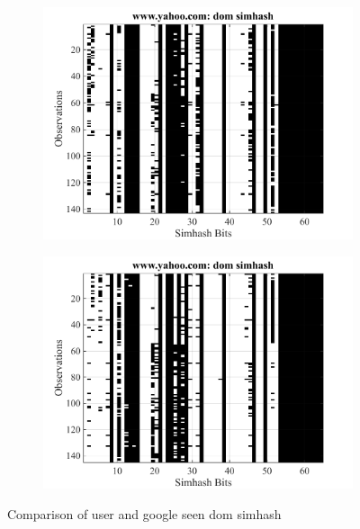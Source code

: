 %


\begin{figure}[t]
  \centering
  \begin{subfigure}
    \centering
    \includegraphics[width=.5\textwidth]{fig/yahoo-dom-user}
    \label{fig:yahoo-dom-user}
  \end{subfigure}%
  \begin{subfigure}
    \centering
    \includegraphics[width=.5\textwidth]{fig/yahoo-dom-google}
    \label{fig:yahoo-dom-google}
  \end{subfigure}
  \caption{Comparison of user and google seen dom simhash}
  \label{fig:yahoo-simhash}
\end{figure}



%
%
%


%

